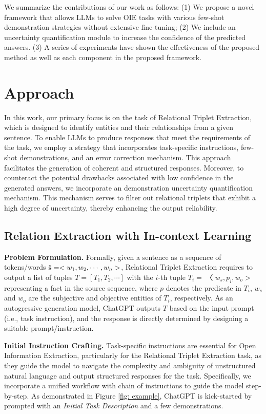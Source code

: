 \documentclass{article}
\begin{document}
We summarize the contributions of our work as follows: (1) We propose a novel framework that allows LLMs to solve OIE tasks with various few-shot demonstration strategies without extensive fine-tuning; (2) We include an uncertainty quantification module to increase the confidence of the predicted answers. (3) A series of experiments have shown the effectiveness of the proposed method as well as each component in the proposed framework.

\section{Approach}
In this work, our primary focus is on the task of Relational Triplet Extraction, which is designed to identify entities and their relationships from a given sentence. To enable LLMs to produce responses that meet the requirements of the task, we employ a strategy that incorporates task-specific instructions, few-shot demonstrations, and an error correction mechanism. This approach facilitates the generation of coherent and structured responses. Moreover, to counteract the potential drawbacks associated with low confidence in the generated answers, we incorporate an demonstration uncertainty quantification mechanism. This mechanism serves to filter out relational triplets that exhibit a high degree of uncertainty, thereby enhancing the output reliability.

\subsection{Relation Extraction with In-context Learning}
\noindent\textbf{Problem Formulation.} Formally, given a sentence as a sequence of tokens/words $\Tilde{\mathbf{s}}=<w_1,w_2, \cdots, w_n>$, Relational Triplet Extraction requires to output a list of tuples $T = [T_1, T_2, \cdots]$ with the $i$-th tuple $T_i = 〈w_s, p_i, w_o>$ representing a fact in the source sequence, where $p$ denotes the predicate in $T_i$, $w_s$ and $w_o$ are the subjective and objective entities of $T_i$, respectively. As an autogressive generation model, ChatGPT outputs $T$ based on the input prompt (i.e., task instruction), and the response is directly determined by designing a suitable prompt/instruction. 

\noindent\textbf{Initial Instruction Crafting.} Task-specific instructions are essential for Open Information Extraction, particularly for the Relational Triplet Extraction task, as they guide the model to navigate the complexity and ambiguity of unstructured natural language and output structured responses for the task. Specifically, we incorporate a unified workflow with chain of instructions to guide the model step-by-step. As demonstrated in Figure \ref{fig: example}, ChatGPT is kick-started by prompted with an \textit{Initial Task Description} and a few demonstrations.  
\end{document}
